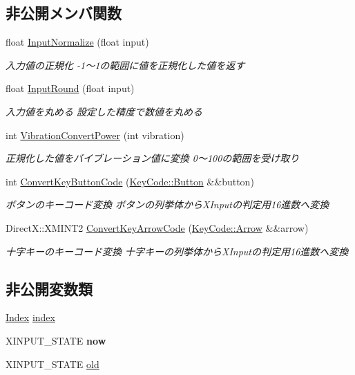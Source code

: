 \subsection*{非公開メンバ関数}
\begin{DoxyCompactItemize}
\item 
float \hyperlink{class_game_pad_ac95431060e8fed9f80568390099954e1}{Input\+Normalize} (float input)
\begin{DoxyCompactList}\small\item\em 入力値の正規化  -\/1〜1の範囲に値を正規化した値を返す \end{DoxyCompactList}\item 
float \hyperlink{class_game_pad_ad8a278a5e571b6c12bf17fad2930643c}{Input\+Round} (float input)
\begin{DoxyCompactList}\small\item\em 入力値を丸める  設定した精度で数値を丸める \end{DoxyCompactList}\item 
int \hyperlink{class_game_pad_ad60a2f019df2277c68212b191f2239ac}{Vibration\+Convert\+Power} (int vibration)
\begin{DoxyCompactList}\small\item\em 正規化した値をバイブレーション値に変換  0〜100の範囲を受け取り \end{DoxyCompactList}\item 
int \hyperlink{class_game_pad_ad2794ef36460ca55325fafa49959d6f2}{Convert\+Key\+Button\+Code} (\hyperlink{namespace_key_code_a03bfec859eac87be20f8952c1eb89de0}{Key\+Code\+::\+Button} \&\&button)
\begin{DoxyCompactList}\small\item\em ボタンのキーコード変換  ボタンの列挙体から\+X\+Inputの判定用16進数へ変換 \end{DoxyCompactList}\item 
Direct\+X\+::\+X\+M\+I\+N\+T2 \hyperlink{class_game_pad_aa6cdd3306f8c747716a113920e0f37ff}{Convert\+Key\+Arrow\+Code} (\hyperlink{namespace_key_code_a16ba82423f2a8ac640d047568347eee4}{Key\+Code\+::\+Arrow} \&\&arrow)
\begin{DoxyCompactList}\small\item\em 十字キーのキーコード変換  十字キーの列挙体から\+X\+Inputの判定用16進数へ変換 \end{DoxyCompactList}\end{DoxyCompactItemize}
\subsection*{非公開変数類}
\begin{DoxyCompactItemize}
\item 
\hyperlink{class_game_pad_a94753052e481fcc532efd78d0dc92250}{Index} \hyperlink{class_game_pad_a7875de9269063a44a5480b1c0c530a84}{index}
\item 
X\+I\+N\+P\+U\+T\+\_\+\+S\+T\+A\+TE {\bfseries now}\hypertarget{class_game_pad_a38f74f9945d5d44b928c493fb6ff9dca}{}\label{class_game_pad_a38f74f9945d5d44b928c493fb6ff9dca}

\item 
X\+I\+N\+P\+U\+T\+\_\+\+S\+T\+A\+TE \hyperlink{class_game_pad_af4b6c92b30887bee9ccde17759716c51}{old}
\end{DoxyCompactItemize}
